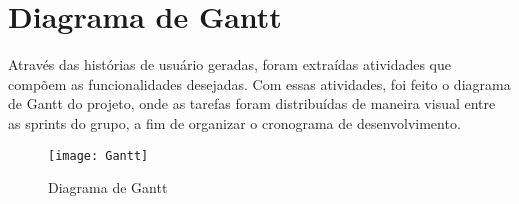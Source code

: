 \section{Diagrama de Gantt}
Através das histórias de usuário geradas, foram extraídas atividades que compõem as funcionalidades desejadas. Com essas atividades, foi feito o diagrama de Gantt do projeto, onde as tarefas foram distribuídas de maneira visual entre as sprints do grupo, a fim de organizar o cronograma de desenvolvimento. 

\begin{figure}[H]
  \centering
  \caption{Diagrama de Gantt}
  \label{fig:cli-srv}
  \texttt{[image: Gantt]}
\end{figure}
